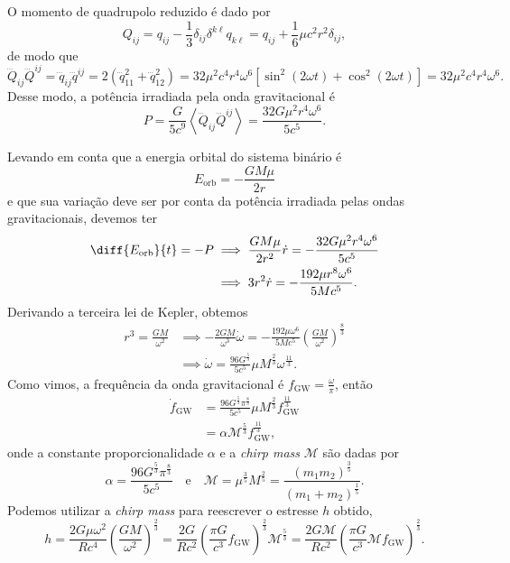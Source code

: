O momento de quadrupolo reduzido é dado por
\begin{equation*}
    Q_{ij} = q_{ij} - \frac13 \delta_{ij} \delta^{k\ell}q_{k\ell} = q_{ij} + \frac16 \mu c^2 r^2 \delta_{ij},
\end{equation*}
de modo que
\begin{equation*}
    \dddot{Q}_{ij} \dddot{Q}^{ij} = \dddot{q}_{ij} \dddot{q}^{ij} = 2\left(\dddot{q}_{11}^2 + \dddot{q}_{12}^2\right) = 32 \mu^2 c^4 r^4 \omega^6 \left[\sin^2(2 \omega t) + \cos^2(2 \omega t)\right] = 32 \mu^2 c^4 r^4 \omega^6.
\end{equation*}
Desse modo, a potência irradiada pela onda gravitacional é
\begin{equation*}
    P = \frac{G}{5c^9}\left\langle \dddot{Q}_{ij}\dddot{Q}^{ij}\right\rangle = \frac{32 G \mu^2 r^4 \omega^6}{5c^5}.
\end{equation*}

Levando em conta que a energia orbital do sistema binário é
\begin{equation*}
    E_\mathrm{orb} = - \frac{GM \mu}{2r}
\end{equation*}
e que sua variação deve ser por conta da potência irradiada pelas ondas gravitacionais, devemos ter
\begin{align*}
    \diff{E_\mathrm{orb}}{t} = - P &\implies \frac{GM\mu}{2r^2}\dot{r} = -\frac{32 G \mu^2r^4 \omega^6}{5c^5}\\
                                   &\implies 3r^2 \dot{r} = - \frac{192\mu r^8 \omega^6}{5Mc^5}.
\end{align*}
Derivando a terceira lei de Kepler, obtemos
\begin{align*}
    r^3 = \frac{GM}{\omega^2} &\implies - \frac{2GM}{\omega^3}\dot\omega = - \frac{192\mu \omega^6}{5Mc^5}\left(\frac{GM}{\omega^2}\right)^{\frac83}\\
                              &\implies \dot\omega = \frac{96 G^{\frac53}}{5c^5} \mu M^\frac23 \omega^\frac{11}{3}.
\end{align*}
Como vimos, a frequência da onda gravitacional é \(f_\mathrm{GW} = \frac{\omega}{\pi}\), então
\begin{align*}
    \dot{f}_\mathrm{GW} &= \frac{96 G^\frac53 \pi^\frac83}{5c^5} \mu M^\frac23 f_\mathrm{GW}^\frac{11}{3}\\
                        &= \alpha \mathcal{M}^\frac53 f_\mathrm{GW}^\frac{11}{3},
\end{align*}
onde a constante proporcionalidade \(\alpha\) e a \emph{chirp mass} \(\mathcal{M}\) são dadas por
\begin{equation*}
    \alpha = \frac{96G^\frac53 \pi^\frac83}{5c^5}\quad\text{e}\quad
    \mathcal{M} = \mu^\frac35 M^\frac25 = \frac{(m_1m_2)^\frac35}{(m_1 + m_2)^\frac15}.
\end{equation*}
Podemos utilizar a \emph{chirp mass} para reescrever o estresse \(h\) obtido,
\begin{equation*}
    h = \frac{2G\mu \omega^2}{Rc^4}\left(\frac{GM}{\omega^2}\right)^\frac23 = \frac{2G}{Rc^2}\left(\frac{\pi G}{c^3}f_\mathrm{GW}\right)^\frac23 \mathcal{M}^{\frac53} = \frac{2G\mathcal{M}}{Rc^2}\left(\frac{\pi G}{c^3} \mathcal{M} f_\mathrm{GW}\right)^\frac23.
\end{equation*}


